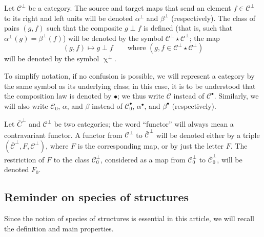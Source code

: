\documentclass[a4paper,oneside,nobib,nofonts,notitlepage,notoc,nols,fleqn,justified]{tufte-book}
\newcommand{\oldpage}[1]{{\reversemarginpar\marginnote{\raggedleft\footnotesize\textit{p.~#1}}}}
\newcommand{\CC}{\mathcal{C}}
\newcommand{\comp}{\upchi}
\begin{document}
Let $\CC^\perp$ be a category.
The source and target maps that send an element $f\in\CC^\perp$ to its right and left units will be denoted $\alpha^\perp$ and $\beta^\perp$ (respectively).
The class of pairs $(g,f)$ such that the composite $g\perp f$ is defined (that is, such that $\alpha^\perp(g)=\beta^\perp(f)$) will be denoted by the symbol $\CC^\perp\star\CC^\perp$;
the map
\[
  (g,f) \longmapsto g\perp f
  \qquad\text{where $(g,f\in\CC^\perp\star\CC^\perp)$}
\]
will be denoted by the symbol $\comp^\perp$.

\oldpage{351}
To simplify notation, if no confusion is possible, we will represent a category by the same symbol as its underlying class;
in this case, it is to be understood that the composition law is denoted by $\bullet$;
we thus write $\CC$ instead of $\CC^\bullet$.
Similarly, we will also write $\CC_0$, $\alpha$, and $\beta$ instead of $\CC_0^\bullet$, $\alpha^\bullet$, and $\beta^\bullet$ (respectively).

Let $\bar{C}^\perp$ and $\CC^\perp$ be two categories;
the word ``functor'' will always mean a contravariant functor.
A functor from $\CC^\perp$ to $\bar{\CC}^\perp$ will be denoted either by a triple $(\bar{\CC}^\perp,F,\CC^\perp)$, where $F$ is the corresponding map, or by just the letter $F$.
The restriction of $F$ to the class $\CC_0^\perp$, considered as a map from $\CC_0^\perp$ to $\bar{\CC}_0^\perp$, will be denoted $F_0$.



\subsection{Reminder on species of structures}
\label{section:i.2}

Since the notion of species of structures \cite{3a} is essential in this article, we will recall the definition and main properties.
\end{document}

